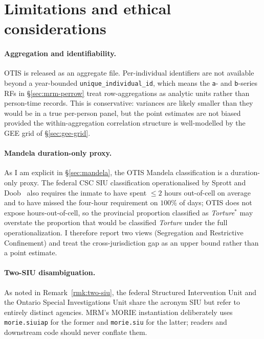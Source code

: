 \documentclass[11pt,a4paper]{article}
\theoremstyle{plain}
\theoremstyle{definition}
\theoremstyle{remark}
\begin{document}
\section{Limitations and ethical considerations}
\label{sec:limitations}

\paragraph{Aggregation and identifiability.} OTIS is released as
an aggregate file. Per-individual identifiers are not available
beyond a year-bounded \texttt{unique\_individual\_id}, which means
the \texttt{a}- and \texttt{b}-series RFs in
\S\ref{sec:mrm-perrow} treat row-aggregations as analytic units
rather than person-time records. This is conservative: variances
are likely smaller than they would be in a true per-person
panel, but the point estimates are not biased provided the
within-aggregation correlation structure is well-modelled by the
GEE grid of \S\ref{sec:gee-grid}.

\paragraph{Mandela duration-only proxy.} As I am explicit in
\S\ref{sec:mandela}, the OTIS Mandela classification is a
duration-only proxy. The federal CSC SIU classification
operationalised by Sprott and Doob~\cite{SprottDoob2021Torture}
also requires the inmate to have spent $\le 2$ hours out-of-cell
on average and to have missed the four-hour requirement on
$100\%$ of days; OTIS does not expose hours-out-of-cell, so the
provincial proportion classified as
\emph{Torture}$^{\ast}$ may overstate the proportion that would
be classified \emph{Torture} under the full operationalization.
I therefore report two views (Segregation and Restrictive
Confinement) and treat the cross-jurisdiction gap as an upper
bound rather than a point estimate.

\paragraph{Two-SIU disambiguation.} As noted in
Remark~\ref{rmk:two-siu}, the federal Structured Intervention
Unit and the Ontario Special Investigations Unit share the
acronym SIU but refer to entirely distinct agencies. MRM's
MORIE instantiation deliberately uses \texttt{morie.siuiap}
for the former and \texttt{morie.siu} for the latter; readers
and downstream code should never conflate them.
\end{document}
